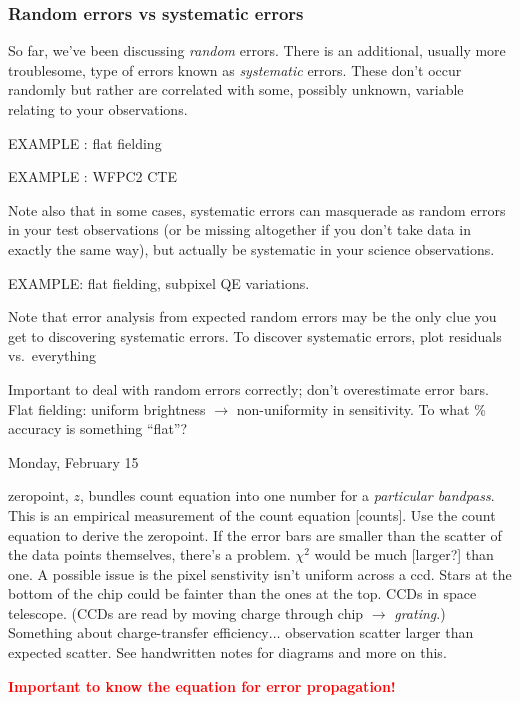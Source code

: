 \documentclass[12pt]{article}
\begin{document}
\subsubsection{Random errors vs systematic errors}
So far, we've been discussing \emph{random} errors.
There is an additional,
usually more troublesome, type of errors known as \emph{systematic} errors.
These don't occur randomly but rather are correlated with some,
possibly unknown, variable relating to your observations.

EXAMPLE : flat fielding

EXAMPLE : WFPC2 CTE

Note also that in some cases, systematic errors can masquerade as
random errors in your test observations (or be missing altogether if
you don't take data in exactly the same way), but actually be
systematic in your science observations.

EXAMPLE: flat fielding, subpixel QE variations.

Note that error analysis from expected random errors may be the only
clue you get to discovering systematic errors. To discover systematic
errors, plot residuals vs.\ everything

\textcolor{om}{\emph{}}

\textcolor{myBlue}{Important to deal with random errors correctly;
    don't overestimate error bars.
    Flat fielding: uniform brightness $\rightarrow$ non-uniformity in
    sensitivity. To what \% accuracy is something ``flat''?
}

\textcolor{date}{Monday, February 15}

\textcolor{myBlue}{zeropoint, $z$, bundles count equation into one
    number for a \emph{particular bandpass}. This is an empirical
    measurement of the count equation [counts]. Use the count
    equation to derive the zeropoint.
    If the error bars are smaller than the scatter of the data points
    themselves, there's a problem. $\chi^2$ would be much [larger?]
    than one.
    A possible issue is the pixel senstivity isn't uniform across a
    ccd. Stars at the bottom of the chip could be fainter than the
    ones at the top. CCDs in space telescope. (CCDs are read
    by moving charge through chip $\rightarrow$ \emph{grating}.)
    Something about charge-transfer efficiency$\ldots$ observation
    scatter larger than expected scatter.
    See handwritten notes for diagrams and more on this.
}

\textcolor{red}{\textbf{Important to know the equation for error
propagation!}
}
\end{document}
